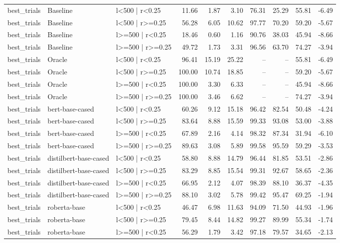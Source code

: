 \begin{tabular}{lllrrrrrrr}
best_trials & Baseline & l<500 | r<0.25 & 11.66 & 1.87 & 3.10 & 76.31 & 25.29 & 55.81 & -6.49 \\
best_trials & Baseline & l<500 | r>=0.25 & 56.28 & 6.05 & 10.62 & 97.77 & 70.20 & 59.20 & -5.67 \\
best_trials & Baseline & l>=500 | r<0.25 & 18.46 & 0.60 & 1.16 & 90.76 & 38.03 & 45.94 & -8.66 \\
best_trials & Baseline & l>=500 | r>=0.25 & 49.72 & 1.73 & 3.31 & 96.56 & 63.70 & 74.27 & -3.94 \\
best_trials & Oracle & l<500 | r<0.25 & 96.41 & 15.19 & 25.22 & -- & -- & 55.81 & -6.49 \\
best_trials & Oracle & l<500 | r>=0.25 & 100.00 & 10.74 & 18.85 & -- & -- & 59.20 & -5.67 \\
best_trials & Oracle & l>=500 | r<0.25 & 100.00 & 3.30 & 6.33 & -- & -- & 45.94 & -8.66 \\
best_trials & Oracle & l>=500 | r>=0.25 & 100.00 & 3.46 & 6.62 & -- & -- & 74.27 & -3.94 \\
best_trials & bert-base-cased & l<500 | r<0.25 & 60.26 & 9.12 & 15.18 & 96.42 & 82.54 & 50.48 & -4.24 \\
best_trials & bert-base-cased & l<500 | r>=0.25 & 83.64 & 8.88 & 15.59 & 99.33 & 93.08 & 53.00 & -3.88 \\
best_trials & bert-base-cased & l>=500 | r<0.25 & 67.89 & 2.16 & 4.14 & 98.32 & 87.34 & 31.94 & -6.10 \\
best_trials & bert-base-cased & l>=500 | r>=0.25 & 89.63 & 3.08 & 5.89 & 99.58 & 95.59 & 59.29 & -3.53 \\
best_trials & distilbert-base-cased & l<500 | r<0.25 & 58.80 & 8.88 & 14.79 & 96.44 & 81.85 & 53.51 & -2.86 \\
best_trials & distilbert-base-cased & l<500 | r>=0.25 & 83.29 & 8.85 & 15.54 & 99.31 & 92.67 & 58.65 & -2.36 \\
best_trials & distilbert-base-cased & l>=500 | r<0.25 & 66.95 & 2.12 & 4.07 & 98.39 & 88.10 & 36.37 & -4.35 \\
best_trials & distilbert-base-cased & l>=500 | r>=0.25 & 88.10 & 3.02 & 5.78 & 99.42 & 95.47 & 69.25 & -1.94 \\
best_trials & roberta-base & l<500 | r<0.25 & 46.47 & 6.98 & 11.63 & 94.09 & 71.50 & 44.93 & -1.96 \\
best_trials & roberta-base & l<500 | r>=0.25 & 79.45 & 8.44 & 14.82 & 99.27 & 89.99 & 55.34 & -1.74 \\
best_trials & roberta-base & l>=500 | r<0.25 & 56.29 & 1.79 & 3.42 & 97.18 & 79.57 & 34.65 & -2.13 \\

\end{tabular}
